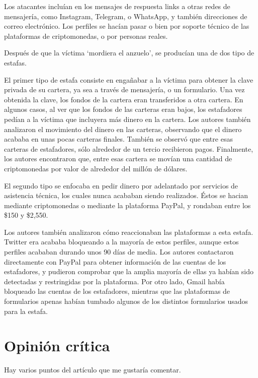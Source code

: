 \documentclass[es]{uc3mreport}
\begin{document}
\begin{report}
        Los atacantes incluían en los mensajes de respuesta links a otras redes de mensajería, como Instagram, Telegram, o WhatsApp, y también direcciones de correo electrónico. Los perfiles se hacían pasar o bien por soporte técnico de las plataformas de criptomonedas, o por personas reales.

        Después de que la víctima `mordiera el anzuelo', se producían una de dos tipo de estafas.

        El primer tipo de estafa consiste en engañabar a la víctima para obtener la clave privada de su cartera, ya sea a través de mensajería, o un formulario. Una vez obtenida la clave, los fondos de la cartera eran transferidos a otra cartera. En algunos casos, al ver que los fondos de las carteras eran bajos, los estafadores pedían a la víctima que incluyera más dinero en la cartera. Los autores también analizaron el movimiento del dinero en las carteras, observando que el dinero acababa en unas pocas carteras finales. También se observó que entre esas carteras de estafadores, sólo alrededor de un tercio recibieron pagos. Finalmente, los autores encontraron que, entre esas cartera se movían una cantidad de criptomonedas por valor de alrededor del millón de dólares.

        El segundo tipo se enfocaba en pedir dinero por adelantado por servicios de asistencia técnica, los cuales nunca acababan siendo realizados. Éstos se hacian mediante criptomonedas o mediante la plataforma PayPal, y rondaban entre los \$150 y \$2,550.

        Los autores también analizaron cómo reaccionaban las plataformas a esta estafa. Twitter era acababa bloqueando a la mayoría de estos perfiles, aunque estos perfiles acababan durando unos 90 días de media. Los autores contactaron directamente con PayPal para obtener información de las cuentas de los estafadores, y pudieron comprobar que la amplia mayoría de ellas ya habían sido detectadas y restringidas por la plataforma. Por otro lado, Gmail había bloqueado las cuentas de los estafadores, mientras que las plataformas de formularios apenas habían tumbado algunos de los distintos formularios usados para la estafa.


        \section{Opinión crítica}
        Hay varios puntos del artículo que me gustaría comentar.


\end{report}
\end{document}

